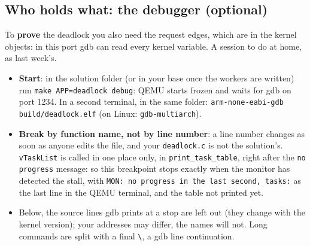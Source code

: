\subsection{Who holds what: the debugger (optional)}
To \textbf{prove} the deadlock you also need the request edges, which are in the kernel objects: in this port gdb can read every kernel variable. A session to do at home, as last week's.
\begin{itemize}
    \item \textbf{Start}: in the solution folder (or in your base once the workers are written) run \texttt{make APP=deadlock debug}: QEMU starts frozen and waits for gdb on port 1234. In a second terminal, in the same folder: \texttt{arm-none-eabi-gdb build/deadlock.elf} (on Linux: \texttt{gdb-multiarch}).
    \item \textbf{Break by function name, not by line number}: a line number changes as soon as anyone edits the file, and your \texttt{deadlock.c} is not the solution's. \texttt{vTaskList} is called in one place only, in \texttt{print\_task\_table}, right after the \texttt{no progress} message: so this breakpoint stops exactly when the monitor has detected the stall, with \texttt{MON: no progress in the last second, tasks:} as the last line in the QEMU terminal, and the table not printed yet.
    \item Below, the source lines gdb prints at a stop are left out (they change with the kernel version); your addresses may differ, the names will not. Long commands are split with a final \texttt{\textbackslash}, a gdb line continuation.
\end{itemize}
